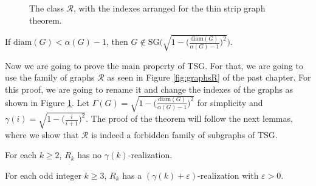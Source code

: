 \begin{figure}
\begin{center}
\begin{scaletikzpicturetowidth}{\textwidth}
\end{scaletikzpicturetowidth}
\end{center}
\caption{The class $\mathcal{R}$, with the indexes arranged for the thin strip graph theorem. \cite{joosCharacterizationMixedUnit2013}}\label{fig:graphsR'}
\end{figure}

\begin{corollary}
  If $\text{diam}(G) < \alpha(G) - 1$, then $G \notin \text{SG}\Bigg(\sqrt{1 - \Big(\frac{\text{diam}(G)}{\alpha(G)-1}\Big)^2}\Bigg)$.
\end{corollary}

Now we are going to prove the main property of TSG. For that, we are going to use the family of graphs $\mathcal{R}$ as seen in Figure \ref{fig:graphsR} of the past chapter. For this proof, we are going to rename it and change the indexes of the graphs as shown in Figure \ref{fig:graphsR'}. Let $\Gamma(G) = \sqrt{1 - \Big(\frac{\text{diam}(G)}{\alpha(G)-1}\Big)^2}$ for simplicity and $\gamma(i) = \sqrt{1 - \Big(\frac{i}{i+1}\Big)^2}$. The proof of the theorem will follow the next lemmas, where we show that $\mathcal{R}$ is indeed a forbidden family of subgraphs of TSG.

\begin{lemma}
  For each $k \geqslant 2$, $R_k$ has no $\gamma(k)$-realization.
\end{lemma}


\begin{lemma}
  For each odd integer $k \geqslant 3$, $R_k$ has a $(\gamma(k) + \varepsilon)$-realization with $\varepsilon > 0$.
\end{lemma}


